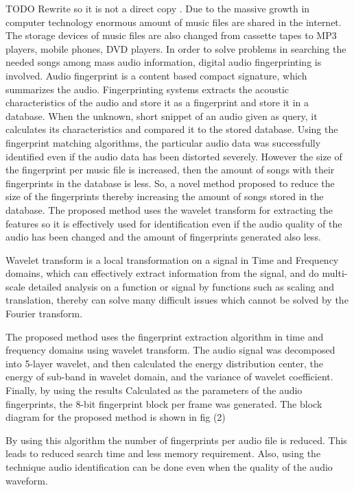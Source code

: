  

TODO Rewrite so it is not a direct copy \cite{6497946}.
Due to the massive growth in computer technology enormous amount of music files are shared in the internet. The storage devices of music files are also changed from cassette tapes to MP3 players, mobile phones, DVD players. In order to solve problems in searching the needed songs among mass audio information, digital audio fingerprinting is involved. Audio fingerprint is a content based compact signature, which summarizes the audio. Fingerprinting systems extracts the acoustic characteristics of the audio and store it as a fingerprint and store it in a database. When the unknown, short snippet of an audio given as query, it calculates its characteristics and compared it to the stored database. Using the fingerprint matching algorithms, the particular audio data was successfully identified even if the audio data has been distorted severely. However the size of the fingerprint per music file is increased, then the amount of songs with their fingerprints in the database is less. So, a novel method proposed to reduce the size of the fingerprints thereby increasing the amount of songs stored in the database. The proposed method uses the wavelet transform for extracting the features so it is effectively used for identification even if the audio quality of the audio has been changed and the amount of fingerprints generated also less.

Wavelet transform is a local transformation on a signal in Time and Frequency domains, which can effectively extract information from the signal, and do multi-scale detailed analysis on a function or signal by functions such as scaling and translation, thereby can solve many difficult issues which cannot be solved by the Fourier transform.

The proposed method uses the fingerprint extraction algorithm in time and frequency domains using wavelet transform. The audio signal was decomposed into 5-layer wavelet, and then calculated the energy distribution center, the energy of sub-band in wavelet domain, and the variance of wavelet coefficient. Finally, by using the results Calculated as the parameters of the audio fingerprints, the 8-bit fingerprint block per frame was generated. The block diagram for the proposed method is shown in fig (2)

By using this algorithm the number of fingerprints per audio file is reduced. This leads to reduced search time and less memory requirement. Also, using the technique audio identification can be done even when the quality of the audio waveform.
